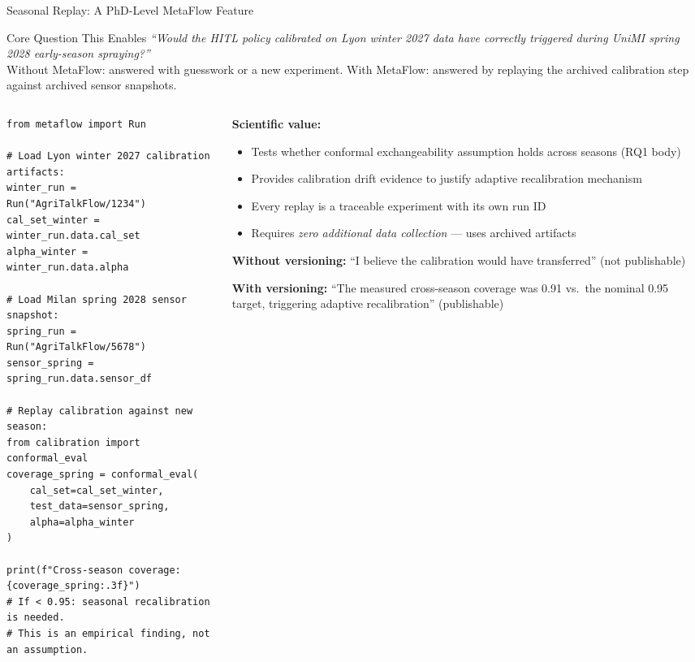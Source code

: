 \documentclass[10pt,aspectratio=169]{beamer}
\begin{document}
\begin{frame}[fragile]{Seasonal Replay: A PhD-Level MetaFlow Feature}

\begin{block}{Core Question This Enables}
\small \emph{``Would the HITL policy calibrated on Lyon winter 2027 data have correctly triggered during UniMI spring 2028 early-season spraying?''}\\
Without MetaFlow: answered with guesswork or a new experiment. With MetaFlow: answered by replaying the archived calibration step against archived sensor snapshots.
\end{block}

\begin{columns}
\begin{column}{0.56\textwidth}
\begin{lstlisting}[title={\scriptsize Seasonal replay implementation}]
from metaflow import Run

# Load Lyon winter 2027 calibration artifacts:
winter_run = Run("AgriTalkFlow/1234")
cal_set_winter = winter_run.data.cal_set
alpha_winter = winter_run.data.alpha

# Load Milan spring 2028 sensor snapshot:
spring_run = Run("AgriTalkFlow/5678")
sensor_spring = spring_run.data.sensor_df

# Replay calibration against new season:
from calibration import conformal_eval
coverage_spring = conformal_eval(
    cal_set=cal_set_winter,
    test_data=sensor_spring,
    alpha=alpha_winter
)

print(f"Cross-season coverage: {coverage_spring:.3f}")
# If < 0.95: seasonal recalibration is needed.
# This is an empirical finding, not an assumption.
\end{lstlisting}
\end{column}
\begin{column}{0.41\textwidth}
\small
\textbf{Scientific value:}
\begin{itemize}
  \item Tests whether conformal exchangeability assumption holds across seasons (RQ1 body)
  \item Provides calibration drift evidence to justify adaptive recalibration mechanism
  \item Every replay is a traceable experiment with its own run ID
  \item Requires \emph{zero additional data collection} --- uses archived artifacts
\end{itemize}

\vspace{0.3cm}
\textbf{Without versioning:}
``I believe the calibration would have transferred'' (not publishable)

\textbf{With versioning:}
``The measured cross-season coverage was 0.91 vs.\ the nominal 0.95 target, triggering adaptive recalibration'' (publishable)
\end{column}
\end{columns}

\end{frame}
\end{document}
